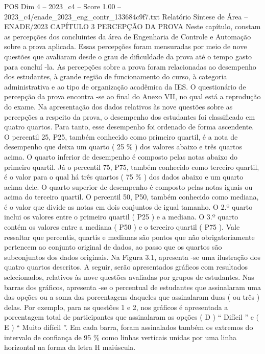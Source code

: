 \begin{textsample}{POS Dim 4 – 2023\_c4 – Score 1.00 – 2023\_c4/enade\_2023\_eng\_contr\_133684c9f7.txt}  \label{ex:f4_pos_178}
Relatório Síntese de Área – ENADE/2023 CAPÍTULO 3 PERCEPÇÃO DA PROVA Neste capítulo, constam as percepções dos concluintes da área de Engenharia de Controle e Automação sobre a prova aplicada.
Essas percepções foram mensuradas por meio de nove questões que avaliaram desde o grau de dificuldade da prova até o tempo gasto para concluí -la.
As percepções sobre a prova foram relacionadas ao desempenho dos estudantes, à grande região de funcionamento do curso, à categoria administrativa e ao tipo de organização acadêmica da IES.
O questionário de percepção da prova encontra -se ao final do Anexo VII, no qual está a reprodução do exame.
Na apresentação dos dados relativos às nove questões sobre as percepções a respeito da prova, o desempenho dos estudantes foi classificado em quatro quartos.
Para tanto, esse desempenho foi ordenado de forma ascendente.
O percentil 25, P25, também conhecido como primeiro quartil, é a nota de desempenho que deixa um quarto ( 25 \% ) dos valores abaixo e três quartos acima.
O quarto inferior de desempenho é composto pelas notas abaixo do primeiro quartil.
Já o percentil 75, P75, também conhecido como terceiro quartil, é o valor para o qual há três quartos ( 75 \% ) dos dados abaixo e um quarto acima dele.
O quarto superior de desempenho é composto pelas notas iguais ou acima do terceiro quartil.
O percentil 50, P50, também conhecido como mediana, é o valor que divide as notas em dois conjuntos de igual tamanho.
O 2.º quarto inclui os valores entre o primeiro quartil ( P25 ) e a mediana.
O 3.º quarto contém os valores entre a mediana ( P50 ) e o terceiro quartil ( P75 ).
Vale ressaltar que percentis, quartis e medianas são pontos que não obrigatoriamente pertencem ao conjunto original de dados, ao passo que os quartos são subconjuntos dos dados originais.
Na Figura 3.1, apresenta -se uma ilustração dos quatro quartos descritos.
A seguir, serão apresentados gráficos com resultados selecionados, relativos às nove questões avaliadas por grupos de estudantes.
Nas barras dos gráficos, apresenta -se o percentual de estudantes que assinalaram uma das opções ou a soma das porcentagens daqueles que assinalaram duas ( ou três ) delas.
Por exemplo, para as questões 1 e 2, nos gráficos é apresentada a porcentagem total de participantes que assinalaram as opções ( D ) “ Difícil ” e ( E ) “ Muito difícil ”.
Em cada barra, foram assinalados também os extremos do intervalo de confiança de 95 \% como linhas verticais unidas por uma linha horizontal na forma da letra H maiúscula.

\end{textsample}
